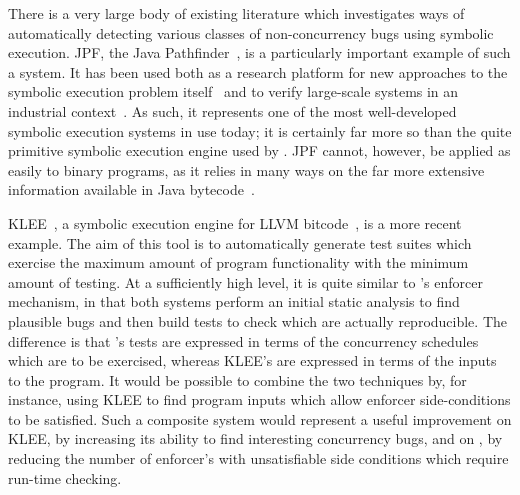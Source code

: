 There is a very large body of existing literature which investigates
ways of automatically detecting various classes of non-concurrency
bugs using symbolic execution.  JPF, the Java
Pathfinder~\cite{Havelund2000}, is a particularly important example of
such a system.  It has been used both as a research platform for new
approaches to the symbolic execution problem
itself~\cite{D'Amorim2008,Gligoric2010} and to verify large-scale
systems in an industrial context~\cite{FFFPCZsCZreanu2008}.  As such,
it represents one of the most well-developed symbolic execution
systems in use today; it is certainly far more so than the quite
primitive symbolic execution engine used by {\implementation}.  JPF
cannot, however, be applied as easily to binary programs, as it relies
in many ways on the far more extensive information available in Java
bytecode~\cite{Lindholm2013}.

KLEE~\cite{Cadar}, a symbolic execution engine for LLVM
bitcode~\cite{FFFLattner2013}, is a more recent example.  The aim of
this tool is to automatically generate test suites which exercise the
maximum amount of program functionality with the minimum amount of
testing.  At a sufficiently high level, it is quite similar to
{\technique}'s enforcer mechanism, in that both systems perform an
initial static analysis to find plausible bugs and then build tests to
check which are actually reproducible.  The difference is that
{\technique}'s tests are expressed in terms of the concurrency
schedules which are to be exercised, whereas KLEE's are expressed in
terms of the inputs to the program.  It would be possible to combine the two techniques by,
for instance, using KLEE to find program inputs which allow
{\technique} enforcer side-conditions to be satisfied.  Such a
composite system would represent a useful improvement on KLEE, by
increasing its ability to find interesting concurrency bugs, and on
{\technique}, by reducing the number of enforcer's with unsatisfiable
side conditions which require run-time checking.

